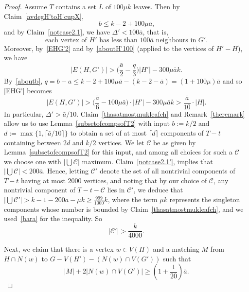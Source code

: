 \documentclass[10pt,a4paper]{amsart}
\begin{document}
          \begin{proof}
          Assume $T$ contains a set $L$ of  $100\mu k$ leaves. Then by
          Claim~\ref{avdegH'toH'cupX},  
          \begin{equation}\label{aboutb}
            \text{$b\le k-2+100 \mu \bar a$,}
         \end{equation}
         and by
         Claim~\ref{notcase2.1}, we have $\Delta'< 100\bar a$, that is,
              \begin{equation}\label{aboutH'100}
        \text{each vertex  of $H'$ has less than $100\bar a$ neighbours in $G'$.}
         \end{equation}
         Moreover, by~\eqref{EHG'2}
    and by~\eqref{aboutH'100} (applied to the vertices of  $H'-H$),  we have   \begin{equation}\label{EHG'}
  |E(H, G')| >  \big(\frac{\bar a}2 -\frac q3\big) |H'| -300 \mu \bar a  k.\end{equation} 
  By~\eqref{aboutb}, 
 $q =b-a\le k-2+100\mu \bar a  -  (k-2-\bar a)= (1+100\mu)\bar a$ and so \eqref{EHG'} becomes 
$$
|E(H, G')| > \big(\frac{\bar a}6 -100\mu\bar a\big)\cdot |H'|  -300 \mu \bar a  k> \frac{\bar a}{10}\cdot |H|.
$$ 
In particular, $\Delta'>\bar a/{10}$. 
Claim~\ref{thasatmostmukleafch} and Remark~\ref{theremark} allow us to use Lemma~\ref{subsetofcompsofT2} with input $b:=k/2$ and $d:=\max\{1,\lceil \bar a/{10}\rceil\}$ to obtain a set of at most $\lceil d\rceil$ components of $T-t$ containing between $2d$ and $k/2$ vertices. 
We let $\mathcal C$ be as given by Lemma~\ref{subsetofcompsofT2} for this input, and among all choices for such a $\mathcal C$ we choose one with $|\bigcup\mathcal C|$ maximum.     Claim~\ref{notcase2.1'},    implies  that $|\bigcup\mathcal C|<200\bar a$.
         Hence, letting $\mathcal C'$ denote the set of all nontrivial components of $T-t$ having at most $2000$ vertices, and noting that by our choice of $\mathcal C$, any nontrivial component of $T-t-\mathcal C$ lies in $\mathcal C'$, we deduce that 
 $|\bigcup\mathcal C'|>k-1-200\bar a-\mu k\ge \frac{999}{1000}k$, where the term $\mu k$ represents the singleton components whose number is bounded by Claim~\ref{thasatmostmukleafch}, and we used~\eqref{bara} for the inequality. So 
     \begin{equation}\label{thesmallcomps}
     |\mathcal C'|>\frac k{4000}.
       \end{equation}

Next, we claim that there is a vertex $w\in V(H)$ and a matching 
$M$ from $H \cap N(w)$ to $G-V(H')-(N(w) \cap V(G'))$ such that 
    \begin{equation}\label{thematching}
        \text{$|M|+2|N(w)\cap V(G')| \ge (1+\frac{1}{20})\bar a$.}
         \end{equation}
         

\end{proof}
\end{document}
